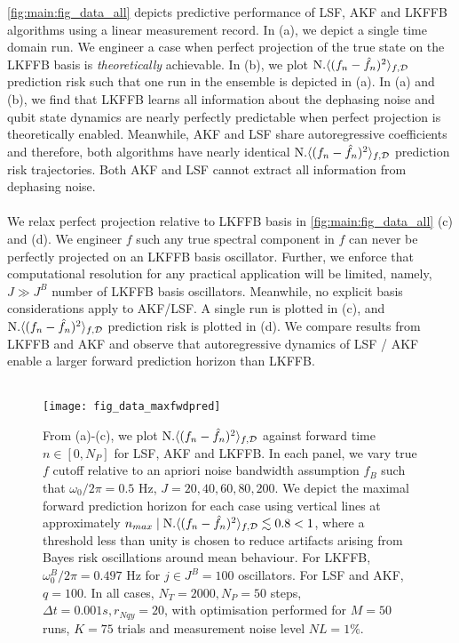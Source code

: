 \documentclass[pra, reprint]{revtex4-1}
\begin{document}
\cref{fig:main:fig_data_all} depicts predictive performance of LSF, AKF and LKFFB algorithms using a linear measurement record. In (a), we depict a single time domain run. We engineer a case when perfect projection of the true state on the LKFFB basis is \textit{theoretically} achievable. In (b), we plot $\text{N.} \langle (f_n - \hat{f}_n)^2 \rangle_{f, \mathcal{D}}$ prediction risk such that one run in the ensemble is depicted in (a).  In (a) and (b), we find that LKFFB learns all information about the dephasing noise and qubit state dynamics are nearly perfectly predictable when perfect projection is theoretically enabled. Meanwhile, AKF and LSF share autoregressive coefficients and therefore, both algorithms have nearly identical $\text{N.} \langle (f_n - \hat{f}_n)^2 \rangle_{f, \mathcal{D}}$ prediction risk trajectories. Both AKF and LSF cannot extract all information from dephasing noise.
\\
\\
We relax perfect projection relative to LKFFB basis in \cref{fig:main:fig_data_all}  (c) and (d). We engineer $f$ such any true spectral component in $f$ can never be perfectly projected on an LKFFB basis oscillator. Further, we enforce that  computational resolution for any practical application will be limited, namely, $J \gg J^B$ number of LKFFB basis oscillators. Meanwhile, no explicit basis considerations apply to AKF/LSF. A single run is plotted in (c), and $\text{N.} \langle (f_n - \hat{f}_n)^2 \rangle_{f, \mathcal{D}}$ prediction risk is plotted in (d). We compare results from LKFFB and AKF and observe that autoregressive dynamics of LSF / AKF enable a larger forward prediction horizon than LKFFB. 
\\
\\
\begin{figure}
    \texttt{[image: fig\_data\_maxfwdpred]}
    \caption{\label{fig:main:fig_data_maxfwdpred} From (a)-(c), we plot $\text{N.} \langle (f_n - \hat{f}_n)^2 \rangle_{f, \mathcal{D}}$ against forward time $n \in [0, N_P]$ for LSF, AKF and LKFFB. In each panel, we vary true $f$ cutoff relative to an apriori noise bandwidth assumption $f_B$ such that $\omega_0 / 2\pi = 0.5$ Hz, $J = 20, 40, 60, 80, 200$. We depict the maximal forward prediction horizon for each case using vertical lines at approximately $ n_{max} \mid  \text{N.} \langle (f_n - \hat{f}_n)^2 \rangle_{f, \mathcal{D}} \lesssim 0.8 < 1$, where a threshold less than unity is chosen to reduce artifacts arising from Bayes risk oscillations around mean behaviour. For LKFFB, $\omega_0^B / 2\pi = 0.497$ Hz for $j \in J^B = 100$ oscillators. For LSF and AKF, $q = 100$. In all cases,  $N_T = 2000, N_P = 50$ steps, $\Delta t = 0.001s, r_{Nqy}=20$, with optimisation performed for $M=50$ runs, $K=75$ trials and measurement noise level $NL = 1\%$.} 
\end{figure} 
\end{document}
